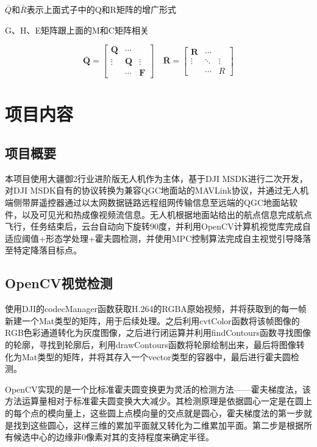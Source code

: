 $\bar{Q}$和$\bar{R}$表示上面式子中的Q和R矩阵的增广形式

G、H、E矩阵跟上面的M和C矩阵相关

$$
\overline{\boldsymbol{Q}}=\left[\begin{array}{ccc}\boldsymbol{Q} & \cdots & \\\vdots & \boldsymbol{Q} & \vdots \\& \cdots & \boldsymbol{F}\end{array}\right] \quad \overline{\boldsymbol{R}}=\left[\begin{array}{ccc}\boldsymbol{R} & \cdots & \\\vdots & \ddots & \vdots \\& \cdots & R\end{array}\right]
$$

\chapter{项目内容}

\section{项目概要}

本项目使用大疆御2行业进阶版无人机作为主体，基于DJI MSDK进行二次开发，对DJI MSDK自有的协议转换为兼容QGC地面站的MAVLink协议，并通过无人机端侧带屏遥控器通过以太网数据链路远程组网传输信息至远端的QGC地面站软件，以及可见光和热成像视频流信息。无人机根据地面站给出的航点信息完成航点飞行，任务结束后，云台自动向下旋转90度，并利用OpenCV计算机视觉库完成自适应阈值+形态学处理+霍夫圆检测，并使用MPC控制算法完成自主视觉引导降落至特定降落目标点。

\section{OpenCV视觉检测}

使用DJI的codecManager函数获取H.264的RGBA原始视频，并将获取到的每一帧新建一个Mat类型的矩阵，用于后续处理。之后利用cvtColor函数将该帧图像的RGB色彩通道转化为灰度图像，之后进行闭运算并利用findContours函数寻找图像的轮廓，寻找到轮廓后，利用drawContours函数将轮廓绘制出来，最后将图像转化为Mat类型的矩阵，并将其存入一个vector类型的容器中，最后进行霍夫圆检测。

OpenCV实现的是一个比标准霍夫圆变换更为灵活的检测方法——霍夫梯度法，该方法运算量相对于标准霍夫圆变换大大减少。其检测原理是依据圆心一定是在圆上的每个点的模向量上，这些圆上点模向量的交点就是圆心，霍夫梯度法的第一步就是找到这些圆心，这样三维的累加平⾯就又转化为二维累加平面。第二步是根据所有候选中心的边缘非0像素对其的支持程度来确定半径。

